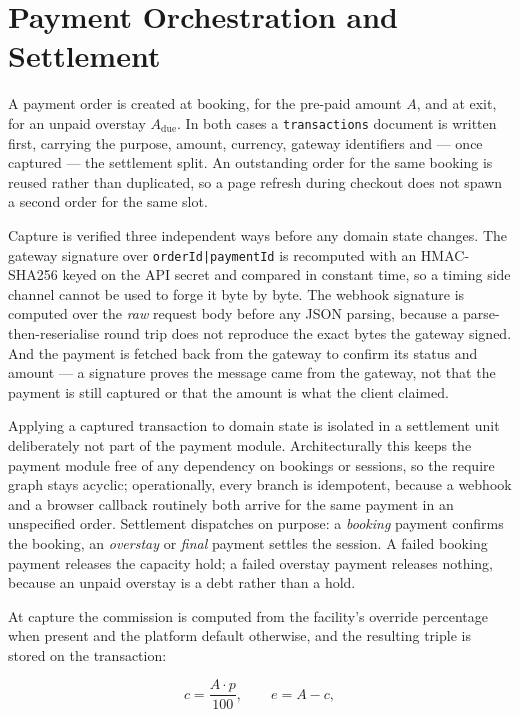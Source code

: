 \documentclass[journal,onecolumn,11pt]{IEEEtran}
\begin{document}
\section{Payment Orchestration and Settlement}
\label{sec:payments}

A payment order is created at booking, for the pre-paid amount $A$, and at
exit, for an unpaid overstay $A_{\text{due}}$. In both cases a
\texttt{transactions} document is written first, carrying the purpose, amount,
currency, gateway identifiers and --- once captured --- the settlement split.
An outstanding order for the same booking is reused rather than duplicated, so
a page refresh during checkout does not spawn a second order for the same slot.

Capture is verified three independent ways before any domain state changes. The
gateway signature over \texttt{orderId|paymentId} is recomputed with an
HMAC-SHA256 keyed on the API secret and compared in constant time, so a timing
side channel cannot be used to forge it byte by byte. The webhook signature is
computed over the \emph{raw} request body before any JSON parsing, because a
parse-then-reserialise round trip does not reproduce the exact bytes the
gateway signed. And the payment is fetched back from the gateway to confirm its
status and amount --- a signature proves the message came from the gateway, not
that the payment is still captured or that the amount is what the client
claimed.

Applying a captured transaction to domain state is isolated in a settlement
unit deliberately not part of the payment module. Architecturally this keeps
the payment module free of any dependency on bookings or sessions, so the
require graph stays acyclic; operationally, every branch is idempotent, because
a webhook and a browser callback routinely both arrive for the same payment in
an unspecified order. Settlement dispatches on purpose: a \textit{booking}
payment confirms the booking, an \textit{overstay} or \textit{final} payment
settles the session. A failed booking payment releases the capacity hold; a
failed overstay payment releases nothing, because an unpaid overstay is a debt
rather than a hold.

At capture the commission is computed from the facility's override percentage
when present and the platform default otherwise, and the resulting triple is
stored on the transaction:

\begin{equation}
  c = \frac{A \cdot p}{100},
  \qquad
  e = A - c,
  \label{eq:commission}
\end{equation}
\end{document}
